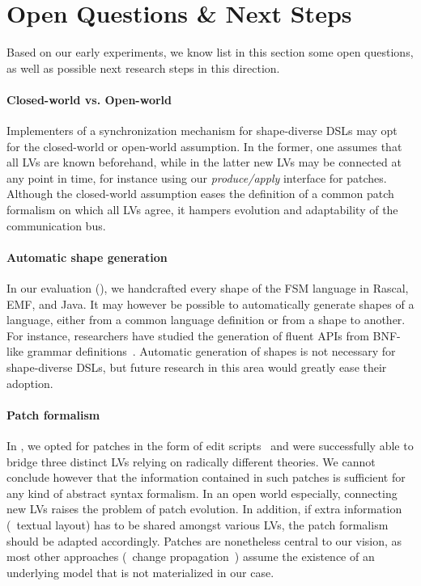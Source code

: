 \section{Open Questions \& Next Steps}
\label{sec:discussion}
Based on our early experiments, we know list in this section some open questions, as well as possible next research steps in this direction.

\paragraph{Closed-world vs. Open-world}
Implementers of a synchronization mechanism for shape-diverse DSLs may opt for the closed-world or open-world assumption.
In the former, one assumes that all LVs are known beforehand, while in the latter new LVs may be connected at any point in time, for instance using our \emph{produce/apply} interface for patches.
Although the closed-world assumption eases the definition of a common patch formalism on which all LVs agree, it hampers evolution and adaptability of the communication bus.

\paragraph{Automatic shape generation}
In our evaluation (), we handcrafted every shape of the FSM language in Rascal, EMF, and Java.
It may however be possible to automatically generate shapes of a language, either from a common language definition or from a shape to another.
For instance, researchers have studied the generation of fluent APIs from BNF-like grammar definitions~\cite{nakamaru2017silverchain}.
Automatic generation of shapes is not necessary for shape-diverse DSLs, but future research in this area would greatly ease their adoption.

\paragraph{Patch formalism}
In \prism, we opted for patches in the form of edit scripts~\cite{rozen2017towards} and were successfully able to bridge three distinct LVs relying on radically different theories.
We cannot conclude however that the information contained in such patches is sufficient for any kind of abstract syntax formalism.
In an open world especially, connecting new LVs raises the problem of patch evolution.
In addition, if extra information (\eg~textual layout) has to be shared amongst various LVs, the patch formalism should be adapted accordingly. %
Patches are nonetheless central to our vision, as most other approaches (\eg~change propagation~\cite{DBLP:conf/etaps/SemerathDHV16}) assume the existence of an underlying model that is not materialized in our case.

